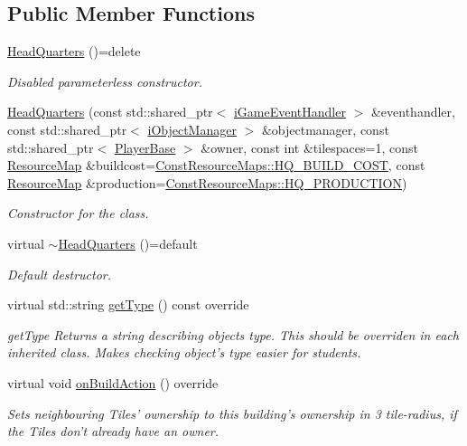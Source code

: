 \subsection*{Public Member Functions}
\begin{DoxyCompactItemize}
\item 
\hyperlink{classCourse_1_1HeadQuarters_a117d344b8498b5fee8da099d5f3c06a5}{Head\-Quarters} ()=delete
\begin{DoxyCompactList}\small\item\em Disabled parameterless constructor. \end{DoxyCompactList}\item 
\hyperlink{classCourse_1_1HeadQuarters_a7c928678452102770fff5d0e5ad1bdf9}{Head\-Quarters} (const std\-::shared\-\_\-ptr$<$ \hyperlink{classCourse_1_1iGameEventHandler}{i\-Game\-Event\-Handler} $>$ \&eventhandler, const std\-::shared\-\_\-ptr$<$ \hyperlink{classCourse_1_1iObjectManager}{i\-Object\-Manager} $>$ \&objectmanager, const std\-::shared\-\_\-ptr$<$ \hyperlink{classCourse_1_1PlayerBase}{Player\-Base} $>$ \&owner, const int \&tilespaces=1, const \hyperlink{namespaceCourse_ab9a46ed9cd00485e318e5731ea2f78d9}{Resource\-Map} \&buildcost=\hyperlink{namespaceCourse_1_1ConstResourceMaps_a629a12b3f9357cd851c54f2126d22502}{Const\-Resource\-Maps\-::\-H\-Q\-\_\-\-B\-U\-I\-L\-D\-\_\-\-C\-O\-S\-T}, const \hyperlink{namespaceCourse_ab9a46ed9cd00485e318e5731ea2f78d9}{Resource\-Map} \&production=\hyperlink{namespaceCourse_1_1ConstResourceMaps_aabaaa4f78c30eed6e966b596423c8dea}{Const\-Resource\-Maps\-::\-H\-Q\-\_\-\-P\-R\-O\-D\-U\-C\-T\-I\-O\-N})
\begin{DoxyCompactList}\small\item\em Constructor for the class. \end{DoxyCompactList}\item 
virtual \hyperlink{classCourse_1_1HeadQuarters_afb7c412b1d0a4997a90c87940de2eabd}{$\sim$\-Head\-Quarters} ()=default
\begin{DoxyCompactList}\small\item\em Default destructor. \end{DoxyCompactList}\item 
virtual std\-::string \hyperlink{classCourse_1_1HeadQuarters_a1d9a996a6a87ca31aeb63dff2d41d242}{get\-Type} () const override
\begin{DoxyCompactList}\small\item\em get\-Type Returns a string describing objects type. This should be overriden in each inherited class. Makes checking object's type easier for students. \end{DoxyCompactList}\item 
virtual void \hyperlink{classCourse_1_1HeadQuarters_addf7f7f78486ce17024a639f15f25649}{on\-Build\-Action} () override
\begin{DoxyCompactList}\small\item\em Sets neighbouring Tiles' ownership to this building's ownership in 3 tile-\/radius, if the Tiles don't already have an owner. \end{DoxyCompactList}\end{DoxyCompactItemize}
